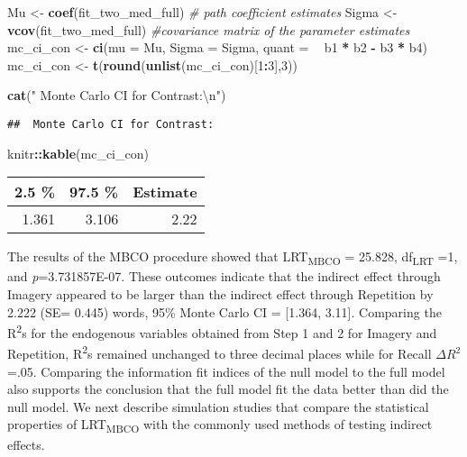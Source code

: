 \documentclass[11pt,]{article}
\newenvironment{Shaded}{\begin{snugshade}}{\end{snugshade}}
\newcommand{\CharTok}[1]{\textcolor[rgb]{0.31,0.60,0.02}{#1}}
\newcommand{\CommentTok}[1]{\textcolor[rgb]{0.56,0.35,0.01}{\textit{#1}}}
\newcommand{\DataTypeTok}[1]{\textcolor[rgb]{0.13,0.29,0.53}{#1}}
\newcommand{\DecValTok}[1]{\textcolor[rgb]{0.00,0.00,0.81}{#1}}
\newcommand{\KeywordTok}[1]{\textcolor[rgb]{0.13,0.29,0.53}{\textbf{#1}}}
\newcommand{\NormalTok}[1]{#1}
\newcommand{\OperatorTok}[1]{\textcolor[rgb]{0.81,0.36,0.00}{\textbf{#1}}}
\newcommand{\StringTok}[1]{\textcolor[rgb]{0.31,0.60,0.02}{#1}}
\begin{document}
\begin{Shaded}
\begin{Highlighting}[]
\NormalTok{Mu <-}\StringTok{ }\KeywordTok{coef}\NormalTok{(fit_two_med_full) }\CommentTok{# path coefficient estimates}
\NormalTok{Sigma <-}
\StringTok{  }\KeywordTok{vcov}\NormalTok{(fit_two_med_full) }\CommentTok{#covariance matrix of the parameter estimates}
\NormalTok{mc_ci_con <-}\StringTok{ }\KeywordTok{ci}\NormalTok{(}\DataTypeTok{mu =}\NormalTok{ Mu,}
                \DataTypeTok{Sigma =}\NormalTok{ Sigma,}
                \DataTypeTok{quant =} \OperatorTok{~}\StringTok{ }\NormalTok{b1 }\OperatorTok{*}\StringTok{ }\NormalTok{b2 }\OperatorTok{-}\StringTok{ }\NormalTok{b3 }\OperatorTok{*}\StringTok{ }\NormalTok{b4)}
\NormalTok{mc_ci_con <-}\StringTok{ }\KeywordTok{t}\NormalTok{(}\KeywordTok{round}\NormalTok{(}\KeywordTok{unlist}\NormalTok{(mc_ci_con)[}\DecValTok{1}\OperatorTok{:}\DecValTok{3}\NormalTok{],}\DecValTok{3}\NormalTok{))}

\KeywordTok{cat}\NormalTok{(}\StringTok{" Monte Carlo CI for Contrast:}\CharTok{\textbackslash{}n}\StringTok{"}\NormalTok{)}
\end{Highlighting}
\end{Shaded}

\begin{verbatim}
##  Monte Carlo CI for Contrast:
\end{verbatim}

\begin{Shaded}
\begin{Highlighting}[]
\NormalTok{knitr}\OperatorTok{::}\KeywordTok{kable}\NormalTok{(mc_ci_con)}
\end{Highlighting}
\end{Shaded}

\begin{longtable}[]{@{}rrr@{}}
\toprule
2.5 \% & 97.5 \% & Estimate\tabularnewline
\midrule
\endhead
1.361 & 3.106 & 2.22\tabularnewline
\bottomrule
\end{longtable}

The results of the MBCO procedure showed that LRT\textsubscript{MBCO} =
25.828, df\textsubscript{LRT} =1, and \emph{p}=3.731857E-07. These
outcomes indicate that the indirect effect through Imagery appeared to
be larger than the indirect effect through Repetition by 2.222 (SE=
0.445) words, 95\% Monte Carlo CI = {[}1.364, 3.11{]}. Comparing the
R\textsuperscript{2}s for the endogenous variables obtained from Step 1
and 2 for Imagery and Repetition, R\textsuperscript{2}s remained
unchanged to three decimal places while for Recall \(\Delta R^2\)=.05.
Comparing the information fit indices of the null model to the full
model also supports the conclusion that the full model fit the data
better than did the null model. We next describe simulation studies that
compare the statistical properties of LRT\textsubscript{MBCO} with the
commonly used methods of testing indirect effects.
\end{document}
